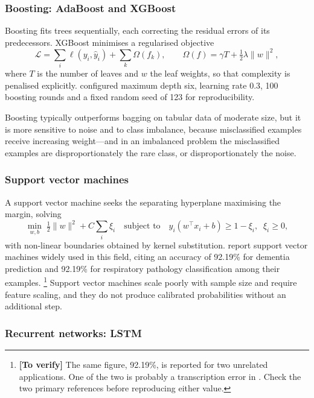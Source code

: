 \documentclass[12pt,a4paper,oneside]{report}
\newcommand{\verify}[1]{\footnote{\textbf{[To verify]} #1}}
\begin{document}
\subsubsection{Boosting: AdaBoost and XGBoost}

Boosting fits trees sequentially, each correcting the residual errors of its predecessors. XGBoost minimises a regularised objective
\begin{equation}
  \mathcal{L} = \sum_i \ell(y_i, \hat{y}_i) + \sum_k \Omega(f_k),
  \qquad \Omega(f) = \gamma T + \tfrac{1}{2}\lambda\lVert w \rVert^2,
\end{equation}
where $T$ is the number of leaves and $w$ the leaf weights, so that complexity is penalised explicitly. \Textcite{mendoza2025} configured maximum depth six, learning rate 0.3, 100 boosting rounds and a fixed random seed of 123 for reproducibility.

Boosting typically outperforms bagging on tabular data of moderate size, but it is more sensitive to noise and to class imbalance, because misclassified examples receive increasing weight---and in an imbalanced problem the misclassified examples are disproportionately the rare class, or disproportionately the noise.

\subsubsection{Support vector machines}

A support vector machine seeks the separating hyperplane maximising the margin, solving
\begin{equation}
  \min_{w,b} \; \tfrac{1}{2}\lVert w \rVert^2 + C\sum_i \xi_i
  \quad\text{subject to}\quad
  y_i(w^{\top} x_i + b) \geq 1 - \xi_i, \;\; \xi_i \geq 0,
\end{equation}
with non-linear boundaries obtained by kernel substitution. \Textcite{liu2025review} report support vector machines widely used in this field, citing an accuracy of 92.19\% for dementia prediction and 92.19\% for respiratory pathology classification among their examples.%
\verify{The same figure, 92.19\%, is reported for two unrelated applications. One of the two is probably a transcription error in \textcite{liu2025review}. Check the two primary references before reproducing either value.}
Support vector machines scale poorly with sample size and require feature scaling, and they do not produce calibrated probabilities without an additional step.

\subsubsection{Recurrent networks: LSTM}
\end{document}
